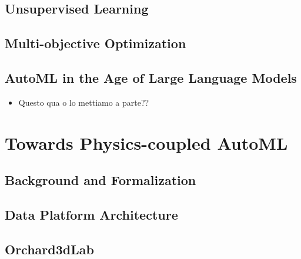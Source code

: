 \documentclass[a4paper,12pt,times,numbered,print,index]{Classes/PhDThesisPSnPDF}
\begin{document}
% 

% 
% 
% 


\chapter{Unsupervised Learning}
\label{automl-chap:unsupervised}

\chapter{Multi-objective Optimization}
\label{automl-chap:moo}

\chapter{AutoML in the Age of Large Language Models}
\label{automl-chap:llm}
\begin{itemize}
    \item Questo qua o lo mettiamo a parte??
\end{itemize}

\part{Towards Physics-coupled AutoML}\label{part:farming}

\chapter{Background and Formalization}
\label{precision-chap:background}

\chapter{Data Platform Architecture}
\label{precision-chap:architecture}

\chapter{Orchard3dLab}
\label{precision-chap:orchard}
\end{document}
